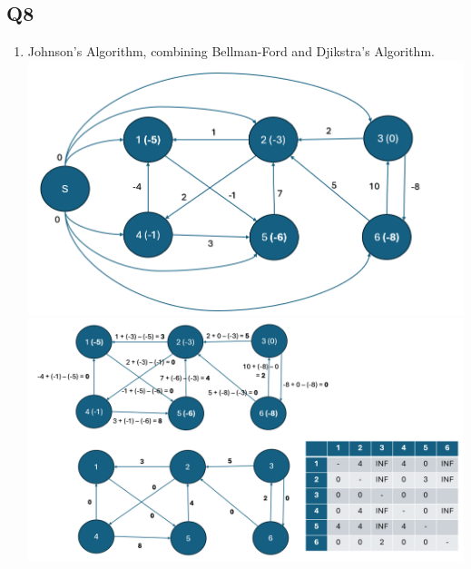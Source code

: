 \documentclass{article}
\begin{document}
\subsection*{Q8     }
\begin{enumerate}[label=(\alph*)]
    \item Johnson's Algorithm, combining Bellman-Ford and Djikstra's Algorithm.
    \subitem \includegraphics[width=.75\textwidth]{problem8.1.png}
    \subitem \includegraphics[width=.75\textwidth]{problem8.2.png}

\end{enumerate}

\end{document}

